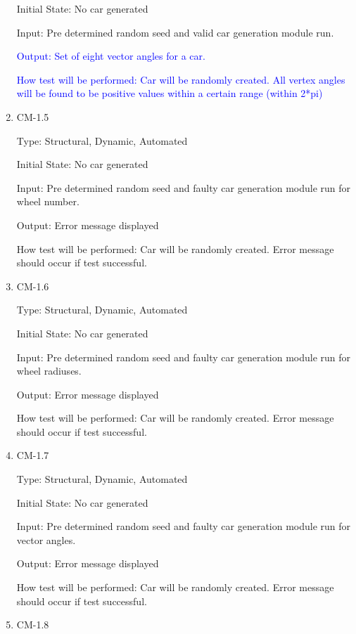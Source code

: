 \documentclass[12pt, titlepage]{article}
\begin{document}
\begin{enumerate}
Initial State: No car generated
					
Input: Pre determined random seed and valid car generation module run.
					
\textcolor{blue}{Output: Set of eight vector angles for a car.}
					
\textcolor{blue}{How test will be performed: Car will be randomly created. All 
vertex angles will 
be found to be positive values within a certain range (within 2*pi)}

\item{CM-1.5\\}

Type: Structural, Dynamic, Automated
					
Initial State: No car generated
					
Input: Pre determined random seed and faulty car generation module run for wheel 
number.
					
Output: Error message displayed
					
How test will be performed:  Car will be randomly created. Error message should 
occur if test successful.

\item{CM-1.6\\}

Type: Structural, Dynamic, Automated
					
Initial State: No car generated
					
Input: Pre determined random seed and faulty car generation module run for wheel 
radiuses.
					
Output: Error message displayed
					
How test will be performed: Car will be randomly created. Error message should 
occur if test successful.

\item{CM-1.7\\}

Type: Structural, Dynamic, Automated
					
Initial State: No car generated
					
Input: Pre determined random seed and faulty car generation module run for 
vector angles.
					
Output: Error message displayed
					
How test will be performed: Car will be randomly created. Error message should 
occur if test successful.

\item{CM-1.8\\}


\end{enumerate}
\end{document}
